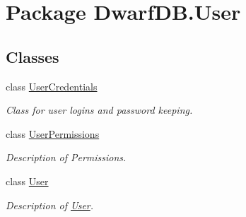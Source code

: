 \hypertarget{namespace_dwarf_d_b_1_1_user}{
\section{Package DwarfDB.User}
\label{namespace_dwarf_d_b_1_1_user}
}
\subsection*{Classes}
\begin{DoxyCompactItemize}
\item 
class \hyperlink{class_dwarf_d_b_1_1_user_1_1_user_credentials}{UserCredentials}
\begin{DoxyCompactList}\small\item\em Class for user logins and password keeping. \item\end{DoxyCompactList}\item 
class \hyperlink{class_dwarf_d_b_1_1_user_1_1_user_permissions}{UserPermissions}
\begin{DoxyCompactList}\small\item\em Description of Permissions. \item\end{DoxyCompactList}\item 
class \hyperlink{class_dwarf_d_b_1_1_user_1_1_user}{User}
\begin{DoxyCompactList}\small\item\em Description of \hyperlink{class_dwarf_d_b_1_1_user_1_1_user}{User}. \item\end{DoxyCompactList}\end{DoxyCompactItemize}
